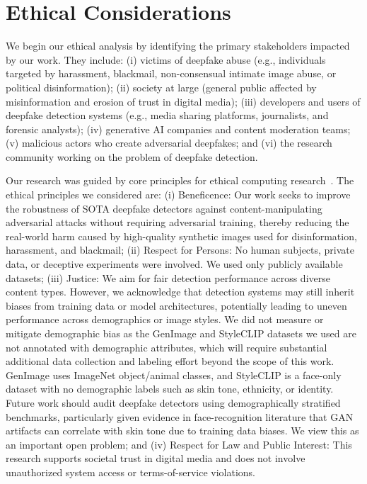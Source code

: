 \documentclass[letterpaper,twocolumn,10pt]{article}
\begin{document}
\section*{Ethical Considerations}

We begin our ethical analysis by identifying the primary stakeholders impacted by our work. They include: (i) victims of deepfake abuse (e.g., individuals targeted by harassment, blackmail, non-consensual intimate image abuse, or political disinformation); (ii) society at large (general public affected by misinformation and erosion of trust in digital media); (iii) developers and users of deepfake detection systems (e.g., media sharing platforms, journalists, and forensic analysts); (iv) generative AI companies and content moderation teams; (v) malicious actors who create adversarial deepfakes; and (vi) the research community working on the problem of deepfake detection.

Our research was guided by core principles for ethical computing research~\cite{kohno2023ethical}.
The ethical principles we considered are: (i) Beneficence: Our work seeks to improve the robustness of SOTA deepfake detectors against content-manipulating adversarial attacks without requiring adversarial training, thereby reducing the real-world harm caused by high-quality synthetic images used for disinformation, harassment, and blackmail; (ii) Respect for Persons: No human subjects, private data, or deceptive experiments were involved. We used only publicly available datasets; (iii) Justice: We aim for fair detection performance across diverse content types. However, we acknowledge that detection systems may still inherit biases from training data or model architectures, potentially leading to uneven performance across demographics or image styles.
We did not measure or mitigate demographic bias as the GenImage and StyleCLIP datasets we used are not annotated with demographic attributes, which will require substantial additional data collection and labeling effort beyond the scope of this work. GenImage uses ImageNet object/animal classes, and StyleCLIP is a face-only dataset with no demographic labels such as skin tone, ethnicity, or identity. Future work should audit deepfake detectors using demographically stratified benchmarks, particularly given evidence in face-recognition literature that GAN artifacts can correlate with skin tone due to training data biases. We view this as an important open problem; and (iv) Respect for Law and Public Interest: This research supports societal trust in digital media and does not involve unauthorized system access or terms-of-service violations.
\end{document}
